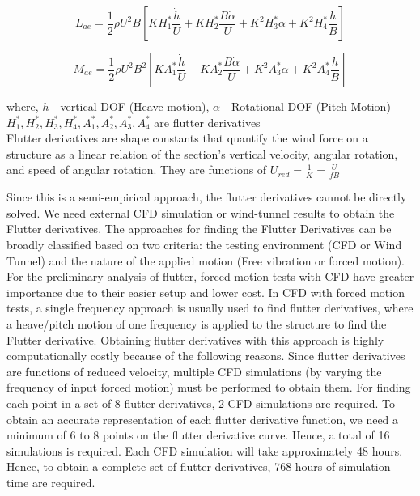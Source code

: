 \documentclass[a4paper, 12pt]{report}
\begin{document}
\begin{equation}
L_{ae} = \frac{1}{2}\rho U^2 B \left[ KH_1^* \frac{\dot{h}}{U} + KH_2^* \frac{B\dot{\alpha}}{U} + K^2 H_3^* \alpha + K^2 H_4^* \frac{h}{B} \right]
\end{equation}

\begin{equation}
M_{ae} = \frac{1}{2}\rho U^2 B^2 \left[ KA_1^* \frac{\dot{h}}{U} + KA_2^* \frac{B\dot{\alpha}}{U} + K^2 A_3^* \alpha + K^2 A_4^* \frac{h}{B} \right]
\end{equation}

where, $h$ - vertical DOF (Heave motion), $\alpha$ - Rotational DOF (Pitch Motion)\\
\phantom{where,} $H_1^*, H_2^*, H_3^*, H_4^*, A_1^*, A_2^*, A_3^*, A_4^*$ are flutter derivatives\\



Flutter derivatives are shape constants that quantify the wind force on a structure as a linear relation 
of the section's vertical velocity, angular rotation, and speed of angular rotation. They are functions 
of $U_{red} = \frac{1}{K} = \frac{U}{fB}$ 

Since this is a semi-empirical approach, the flutter derivatives cannot be directly solved. We need 
external CFD simulation or wind-tunnel results to obtain the Flutter derivatives. The approaches 
for finding the Flutter Derivatives can be broadly classified based on two criteria: the testing 
environment (CFD or Wind Tunnel) and the nature of the applied motion (Free vibration or forced 
motion). For the preliminary analysis of flutter, forced motion tests with CFD have greater 
importance due to their easier setup and lower cost. In CFD with forced motion tests, a single 
frequency approach is usually used to find flutter derivatives, where a heave/pitch motion of one 
frequency is applied to the structure to find the Flutter derivative. Obtaining flutter derivatives with 
this approach is highly computationally costly because of the following reasons. Since flutter 
derivatives are functions of reduced velocity, multiple CFD simulations (by varying the frequency 
of input forced motion) must be performed to obtain them. For finding each point in a set of 8 
flutter derivatives, 2 CFD simulations are required. To obtain an accurate representation of each 
flutter derivative function, we need a minimum of 6 to 8 points on the flutter derivative curve. 
Hence, a total of 16 simulations is required. Each CFD simulation will take approximately 48 hours. 
Hence, to obtain a complete set of flutter derivatives, 768 hours of simulation time are required.  
\end{document}
